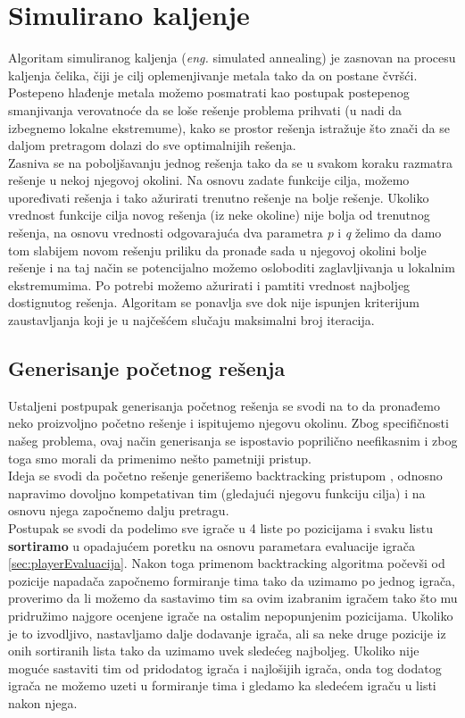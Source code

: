 \documentclass[a4paper]{article}
\newcommand{\eng}[1]{(\textit{eng.} #1)}
\begin{document}
\section{Simulirano kaljenje}
Algoritam simuliranog kaljenja \eng{simulated annealing} je zasnovan na procesu kaljenja čelika, čiji je cilj oplemenjivanje metala tako da on postane čvršći. Postepeno hlađenje metala možemo posmatrati kao postupak postepenog smanjivanja verovatnoće da se loše rešenje problema prihvati (u nadi da izbegnemo lokalne ekstremume), kako se prostor rešenja istražuje što znači da se daljom pretragom dolazi do sve optimalnijih rešenja. \\
Zasniva se na poboljšavanju jednog rešenja tako da se u svakom koraku razmatra rešenje u nekoj njegovoj okolini. Na osnovu zadate funkcije cilja, možemo upoređivati rešenja i tako ažurirati trenutno rešenje na bolje rešenje. Ukoliko vrednost funkcije cilja novog rešenja (iz neke okoline) nije bolja od trenutnog rešenja, na osnovu vrednosti odgovarajuća dva parametra \textit{p} i \textit{q} želimo da damo tom slabijem novom rešenju priliku da pronađe sada u njegovoj okolini bolje rešenje i na taj način se potencijalno možemo osloboditi zaglavljivanja u lokalnim ekstremumima. Po potrebi možemo ažurirati i pamtiti vrednost najboljeg dostignutog rešenja. Algoritam se ponavlja sve dok nije ispunjen kriterijum zaustavljanja koji je u najčešćem slučaju maksimalni broj iteracija. \cite{simuliranoKaljenjeAlicicMatf}

\subsection{Generisanje početnog rešenja}
Ustaljeni postpupak generisanja početnog rešenja se svodi na to da pronađemo neko proizvoljno početno rešenje i ispitujemo njegovu okolinu. Zbog specifičnosti našeg problema, ovaj način generisanja se ispostavio poprilično neefikasnim i zbog toga smo morali da primenimo nešto pametniji pristup. \\
Ideja se svodi da početno rešenje generišemo backtracking pristupom \cite{backtrackingMatfMaric}, odnosno napravimo dovoljno kompetativan tim (gledajući njegovu funkciju cilja) i na osnovu njega započnemo dalju pretragu. \\
Postupak se svodi da podelimo sve igrače u 4 liste po pozicijama i svaku listu \textbf{sortiramo} u opadajućem poretku na osnovu parametara evaluacije igrača \ref{sec:playerEvaluacija}. Nakon toga primenom backtracking algoritma počevši od pozicije napadača započnemo formiranje tima tako da uzimamo po jednog igrača, proverimo da li možemo da sastavimo tim sa ovim izabranim igračem tako što mu pridružimo najgore ocenjene igrače na ostalim nepopunjenim pozicijama. Ukoliko je to izvodljivo, nastavljamo dalje dodavanje igrača, ali sa neke druge pozicije iz onih sortiranih lista tako da uzimamo uvek sledećeg najboljeg. Ukoliko nije moguće sastaviti tim od pridodatog igrača i najlošijih igrača, onda tog dodatog igrača ne možemo uzeti u formiranje tima i gledamo ka sledećem igraču u listi nakon njega.
\end{document}
